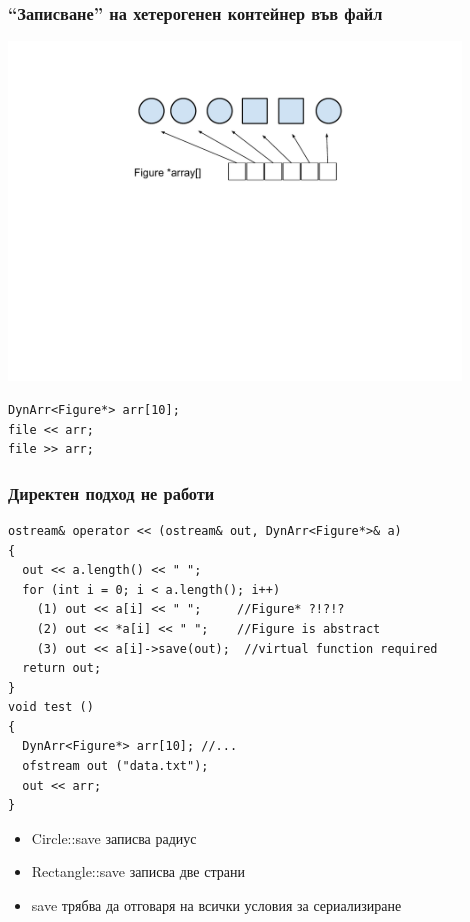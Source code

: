 \documentclass{beamer}
\begin{document}
\begin{frame}[fragile]
\frametitle{``Записване'' на хетерогенен контейнер във файл}

\vspace{-60px}
\begin{center}
\includegraphics[width=12.0cm]{images/array}
\end{center}

\vspace{-160px}
\begin{lstlisting}
DynArr<Figure*> arr[10];
file << arr;
file >> arr;
\end{lstlisting}

\end{frame}





\begin{frame}[fragile]
\frametitle{Директен подход не работи}

\begin{flushleft}
\begin{lstlisting}
ostream& operator << (ostream& out, DynArr<Figure*>& a)
{
  out << a.length() << " ";
  for (int i = 0; i < a.length(); i++)
    (1) out << a[i] << " ";     //Figure* ?!?!?
    (2) out << *a[i] << " ";    //Figure is abstract
    (3) out << a[i]->save(out);  //virtual function required
  return out;
}
void test ()
{
  DynArr<Figure*> arr[10]; //...
  ofstream out ("data.txt");
  out << arr;
}
\end{lstlisting}
\end{flushleft}

\begin{itemize}
  \item Circle::save записва радиус
  \item Rectangle::save записва две страни
  \item save трябва да отговаря на всички условия за сериализиране
\end{itemize}

\end{frame}
\end{document}
